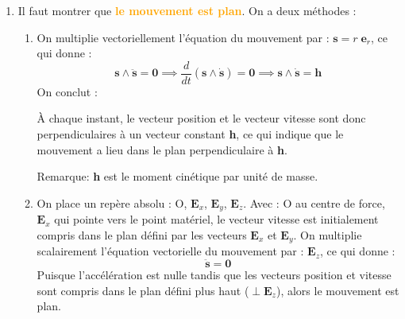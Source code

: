 \documentclass[a4paper]{article}
\begin{document}
\begin{enumerate}





\item Il faut montrer que \textcolor{orange}{\textbf{le mouvement est plan}}. On a deux méthodes : 
\begin{enumerate}

\item On multiplie vectoriellement l'équation du mouvement par : $ \textbf{s} = r \; \textbf{e}_r $, ce qui donne :
\[ \textbf{s} \wedge \ddot{\textbf{s}} = \textbf{0} \implies \frac{d}{d t} (\textbf{s} \wedge \dot{\textbf{s}}) = \textbf{0} \implies \textbf{s} \wedge \dot{\textbf{s}} = \textbf{h} \]
On conclut : 
\begin{siderules}
À chaque instant, le vecteur position et le vecteur vitesse sont donc perpendiculaires à un vecteur constant \textbf{h}, ce qui indique que le mouvement a lieu dans le plan perpendiculaire à \textbf{h}.
\end{siderules}
Remarque: \textbf{h} est le moment cinétique par unité de masse.

\item On place un repère absolu : O, $ \textbf{E}_x $, $ \textbf{E}_y $, $ \textbf{E}_z $. Avec : O au centre de force, $ \textbf{E}_x $ qui pointe vers le point matériel, le vecteur vitesse est initialement compris dans le plan défini par les vecteurs $ \textbf{E}_x $ et $ \textbf{E}_y $. On multiplie scalairement l'équation vectorielle du mouvement par : $ \textbf{E}_z $, ce qui donne : 
\[ \ddot{\textbf{s}} = \textbf{0} \]
Puisque l'accélération est nulle tandis que les vecteurs position et vitesse sont compris dans le plan défini plus haut ($ \perp \textbf{E}_z $), alors le mouvement est plan.

\end{enumerate}






\end{enumerate}
\end{document}
